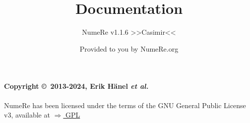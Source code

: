 \documentclass[DIV=17, parskip=half]{scrreprt}
\title{Documentation}
\subtitle{NumeRe v1.1.6 >>Casimir<<}
\date{}
\author{\small Provided to you by NumeRe.org}
\begin{document}
    \maketitle
% 
% 
	\tableofcontents
		\paragraph{Copyright \copyright\ 2013-2024, Erik H\"anel \emph{et al.}} 
		NumeRe has been licensed under the terms of the GNU General Public License v3, available at \href{http://www.gnu.org/licenses/gpl.html}{$\Rightarrow$ GPL}
\end{document}
